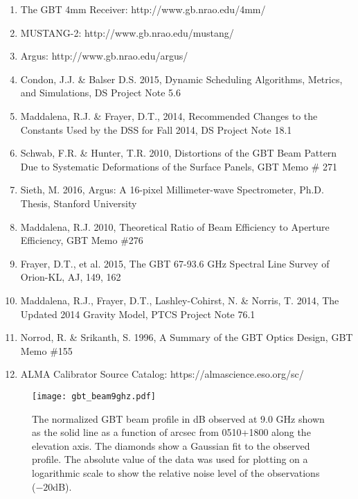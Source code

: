 \documentclass[12pt]{article}
\begin{document}
\begin{enumerate}

\item The GBT 4mm Receiver: http://www.gb.nrao.edu/4mm/

\item MUSTANG-2: http://www.gb.nrao.edu/mustang/

\item Argus:  http://www.gb.nrao.edu/argus/

\item Condon, J.J. \& Balser D.S. 2015, Dynamic Scheduling
  Algorithms, Metrics, and Simulations, DS Project Note 5.6

\item Maddalena, R.J. \& Frayer, D.T., 2014, Recommended Changes to the
  Constants Used by the DSS for Fall 2014, DS Project Note 18.1

\item Schwab, F.R. \& Hunter, T.R. 2010, Distortions of the GBT Beam
  Pattern Due to Systematic Deformations of the Surface Panels, GBT
  Memo \# 271

\item Sieth, M. 2016, Argus: A 16-pixel Millimeter-wave Spectrometer,
  Ph.D. Thesis, Stanford University

\item Maddalena, R.J. 2010, Theoretical Ratio of Beam Efficiency to
  Aperture Efficiency, GBT Memo \#276

\item Frayer, D.T., et al. 2015, The GBT 67-93.6 GHz Spectral Line
  Survey of Orion-KL, AJ, 149, 162

\item Maddalena, R.J., Frayer, D.T., Lashley-Cohirst, N. \& Norris,
  T. 2014, The Updated 2014 Gravity Model, PTCS Project Note 76.1

\item Norrod, R. \& Srikanth, S. 1996, A Summary of the GBT Optics
  Design, GBT Memo \#155

\item ALMA Calibrator Source Catalog:
  https://almascience.eso.org/sc/

\end{enumerate}


\begin{figure}[t]
\texttt{[image: gbt\_beam9ghz.pdf]}
\vspace*{-3cm}
\caption{The normalized GBT beam profile in dB observed at 9.0 GHz
  shown as the solid line as a function of arcsec from 0510+1800 along
  the elevation axis.  The diamonds show a Gaussian fit to the
  observed profile.  The absolute value of the data was used for
  plotting on a logarithmic scale to show the relative noise level of
  the observations ($-20$dB).}
\end{figure}
 
\end{document}
